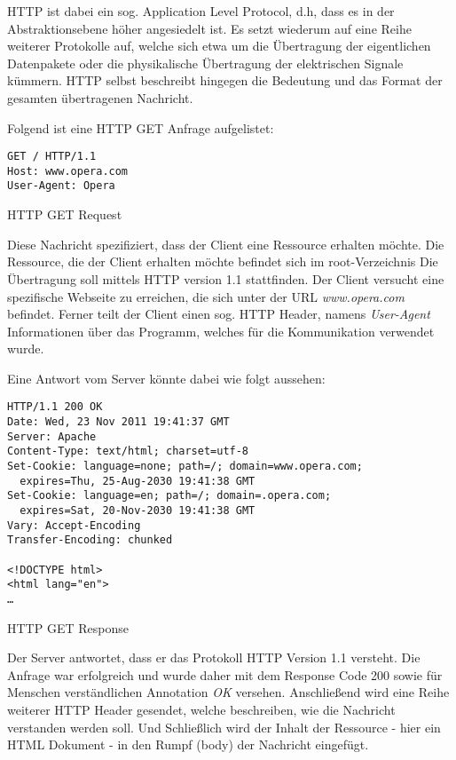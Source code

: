 HTTP ist dabei ein sog. Application Level Protocol, d.h, dass es in der Abstraktionsebene höher angesiedelt ist. Es setzt wiederum auf eine Reihe weiterer Protokolle auf, welche sich etwa um die Übertragung der eigentlichen Datenpakete oder die physikalische Übertragung der elektrischen Signale kümmern. HTTP selbst beschreibt hingegen die Bedeutung und das Format der gesamten übertragenen Nachricht.

Folgend ist eine HTTP GET Anfrage aufgelistet:

\begin{listing}[H]
\begin{verbatim}
GET / HTTP/1.1
Host: www.opera.com
User-Agent: Opera
\end{verbatim}
\caption{HTTP GET Request}
\end{listing}

Diese Nachricht spezifiziert, dass der Client eine Ressource erhalten möchte.
Die Ressource, die der Client erhalten möchte befindet sich im root-Verzeichnis
Die Übertragung soll mittels HTTP version 1.1 stattfinden. Der Client versucht eine spezifische Webseite zu erreichen, die sich unter der URL \emph{www.opera.com} befindet. Ferner teilt der Client einen sog. HTTP Header, namens \emph{User-Agent} Informationen über das Programm, welches für die Kommunikation verwendet wurde.

Eine Antwort vom Server könnte dabei wie folgt aussehen:

\begin{listing}[H]
\begin{verbatim}
HTTP/1.1 200 OK
Date: Wed, 23 Nov 2011 19:41:37 GMT
Server: Apache
Content-Type: text/html; charset=utf-8
Set-Cookie: language=none; path=/; domain=www.opera.com; 
  expires=Thu, 25-Aug-2030 19:41:38 GMT
Set-Cookie: language=en; path=/; domain=.opera.com; 
  expires=Sat, 20-Nov-2030 19:41:38 GMT
Vary: Accept-Encoding
Transfer-Encoding: chunked

<!DOCTYPE html>
<html lang="en">
…
\end{verbatim}
\caption{HTTP GET Response}
\end{listing}

Der Server antwortet, dass er das Protokoll HTTP Version 1.1 versteht. Die Anfrage war erfolgreich und wurde daher mit dem Response Code 200 sowie für Menschen verständlichen Annotation \textit{OK} versehen. Anschließend wird eine Reihe weiterer HTTP Header gesendet, welche beschreiben, wie die Nachricht verstanden werden soll. Und Schließlich wird der Inhalt der Ressource - hier ein HTML Dokument - in den Rumpf (body) der Nachricht eingefügt.

